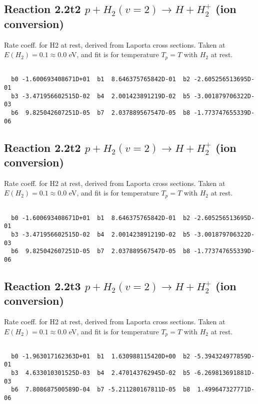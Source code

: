 \documentclass[12pt,dvipdfmx]{article}
\begin{document}
\newpage
\subsection{
Reaction 2.2t2
$ p + H_2(v=2) \rightarrow H + H_2^+$ (ion conversion)
}
Rate coeff. for H2 at rest, derived from Laporta cross sections.
Taken at $E(H_2) = 0.1 \approx 0.0$ eV,  and fit is for temperature $T_p=T$ with $H_2$ at rest.

\begin{small}\begin{verbatim}

  b0 -1.600693408671D+01  b1  8.646375765842D-01  b2 -2.605256513695D-01
  b3 -3.471956602515D-02  b4  2.001423891219D-02  b5 -3.001879706322D-03
  b6  9.825042607251D-05  b7  2.037889567547D-05  b8 -1.773747655339D-06

\end{verbatim}\end{small}

\newpage
\subsection{
Reaction 2.2t2
$ p + H_2(v=2) \rightarrow H + H_2^+$ (ion conversion)
}
Rate coeff. for H2 at rest, derived from Laporta cross sections.
Taken at $E(H_2) = 0.1 \approx 0.0$ eV,  and fit is for temperature $T_p=T$ with $H_2$ at rest.

\begin{small}\begin{verbatim}

  b0 -1.600693408671D+01  b1  8.646375765842D-01  b2 -2.605256513695D-01
  b3 -3.471956602515D-02  b4  2.001423891219D-02  b5 -3.001879706322D-03
  b6  9.825042607251D-05  b7  2.037889567547D-05  b8 -1.773747655339D-06

\end{verbatim}\end{small}

\newpage
\subsection{
Reaction 2.2t3
$ p + H_2(v=2) \rightarrow H + H_2^+$ (ion conversion)
}
Rate coeff. for H2 at rest, derived from Laporta cross sections.
Taken at $E(H_2) = 0.1 \approx 0.0$ eV,  and fit is for temperature $T_p=T$ with $H_2$ at rest.

\begin{small}\begin{verbatim}

  b0 -1.963017162363D+01  b1  1.630988115420D+00  b2 -5.394324977859D-01
  b3  4.633010301525D-03  b4  2.470143762945D-02  b5 -6.269813691881D-03
  b6  7.808687500589D-04  b7 -5.211280167811D-05  b8  1.499647327771D-06

\end{verbatim}\end{small}
\end{document}
